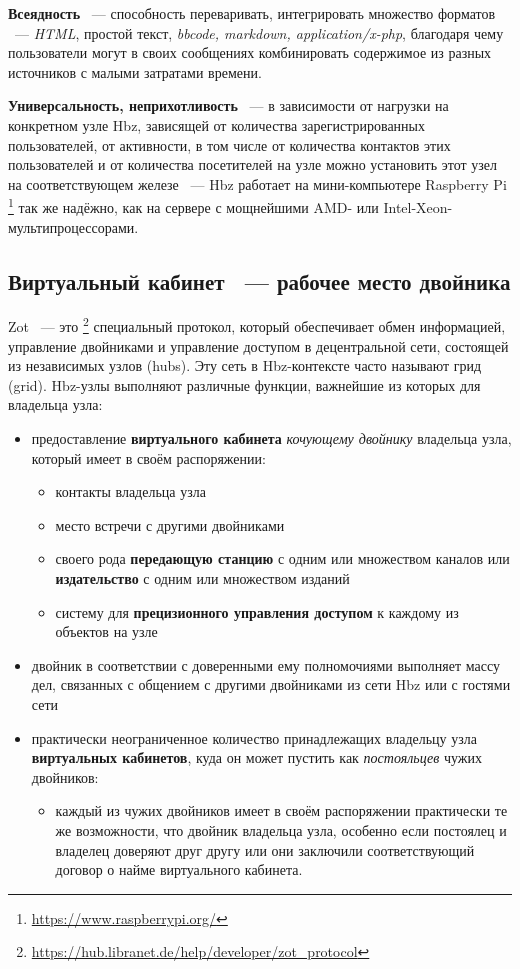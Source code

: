 \documentclass[10pt, a5paper]{article}
\begin{document}
\textbf{Всеядность} ~--- способность переваривать, интегрировать множество форматов ~--- \emph{HTML}, простой текст, \emph{bbcode, markdown, \linebreak application/x-php}, благодаря чему пользователи могут в своих сообщениях комбинировать содержимое из разных источников с малыми затратами времени.

\textbf{Универсальность, неприхотливость} ~--- в зависимости от нагрузки на конкретном узле Hbz, зависящей от количества зарегистрированных пользователей, от активности, в том числе от количества контактов этих пользователей и от количества посетителей на узле можно установить этот узел на соответствующем железе ~--- Hbz работает на мини-компьютере Raspberry Pi \footnote{\url{https://www.raspberrypi.org/}} так же надёжно, как на сервере с мощнейшими AMD- или Intel-Xeon- мультипроцессорами.

\subsection*{Виртуальный кабинет ~--- рабочее место двойника}

Zot ~--- это \footnote{\url{https://hub.libranet.de/help/developer/zot_protocol}} специальный протокол, который обеспечивает обмен информацией, управление двойниками и управление доступом в децентральной сети, состоящей из независимых узлов (hubs). Эту сеть в Hbz-контексте часто называют грид (grid). Hbz-узлы выполняют различные функции, важнейшие из которых для владельца узла:

\begin{itemize}
  \item предоставление \textbf{виртуального кабинета} \emph{кочующему двойнику} владельца узла, который имеет в своём распоряжении:
  \begin{itemize}
	  \item контакты владельца узла
	  \item место встречи с другими двойниками
	  \item своего рода \textbf{передающую станцию} с одним или множеством каналов или \textbf{издательство} с одним или множеством изданий
	  \item систему для \textbf{прецизионного управления доступом} к каждому из объектов на узле
  \end{itemize}
  \item двойник в соответствии с доверенными ему полномочиями выполняет массу дел, связанных с общением с другими двойниками из сети Hbz или с гостями сети
  \item практически неограниченное количество принадлежащих владельцу узла \textbf{виртуальных кабинетов}, куда он может пустить как \emph{постояльцев} чужих двойников:
	\begin{itemize}
	  	\item каждый из чужих двойников имеет в своём распоряжении практически те же возможности, что двойник владельца узла, особенно если постоялец и владелец доверяют друг другу или они заключили соответствующий договор о найме виртуального кабинета.
	\end{itemize}
\end{itemize}
\end{document}
